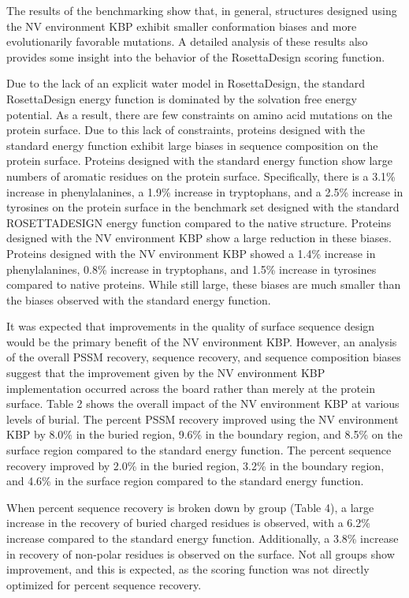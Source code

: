 The results of the benchmarking show that, in general, structures designed using the NV environment KBP exhibit smaller conformation biases and more evolutionarily favorable mutations.
A detailed analysis of these results also provides some insight into the behavior of the RosettaDesign scoring function.

Due to the lack of an explicit water model in RosettaDesign, the standard RosettaDesign energy function is dominated by the solvation free energy potential.
As a result, there are few constraints on amino acid mutations on the protein surface.
Due to this lack of constraints, proteins designed with the standard energy function exhibit large biases in sequence composition on the protein surface.
Proteins designed with the standard energy function show large numbers of aromatic residues on the protein surface.
Specifically, there is a 3.1\% increase in phenylalanines, a 1.9\% increase in tryptophans, and a 2.5\% increase in tyrosines on the protein surface in the benchmark set designed with the standard ROSETTADESIGN energy function compared to the native structure.
Proteins designed with the NV environment KBP show a large reduction in these biases.
Proteins designed with the NV environment KBP showed a 1.4\% increase in phenylalanines, 0.8\% increase in tryptophans, and 1.5\% increase in tyrosines compared to native proteins.
While still large, these biases are much smaller than the biases observed with the standard energy function. 

It was expected that improvements in the quality of surface sequence design would be the primary benefit of the NV environment KBP.
However, an analysis of the overall PSSM recovery, sequence recovery, and sequence composition biases suggest that the improvement given by the NV environment KBP implementation occurred across the board rather than merely at the protein surface.
Table 2 shows the overall impact of the NV environment KBP at various levels of burial.
The percent PSSM recovery improved using the NV environment KBP by 8.0\% in the buried region, 9.6\% in the boundary region, and 8.5\% on the surface region compared to the standard energy function.
The percent sequence recovery improved by 2.0\% in the buried region, 3.2\% in the boundary region, and 4.6\% in the surface region compared to the standard energy function.
 
 When percent sequence recovery is broken down by group (Table 4), a large increase in the recovery of buried charged residues is observed, with a 6.2\% increase compared to the standard energy function. 
 Additionally, a 3.8\% increase in recovery of non-polar residues is observed on the surface.
 Not all groups show improvement, and this is expected, as the scoring function was not directly optimized for percent sequence recovery.
 
